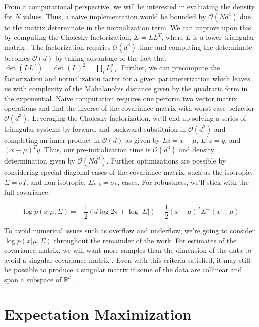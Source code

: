 \documentclass{article}
\newcommand{\boundedBy}[1]{\mathcal{O} \left ( #1 \right )}
\begin{document}
From a computational perspective, we will be interested in evaluating the density for $N$ values. Thus, a naive implementation would be bounded by $\boundedBy{N d^4}$ due to the matrix determinate in the normalization term. We can improve upon this by computing the Cholesky factorization, $\Sigma = L L^T$, where $L$ is a lower triangular matrix \cite[157-158]{kincaid2002}. The factorization requries $\boundedBy{d^3}$ time and computing the determinate becomes $\boundedBy{d}$ by taking advantage of the fact that $\det\left(L L^T\right) = \det(L)^2 = \prod_i L_{i,i}^2$. Further, we can precompute the factorization and normalization factor for a given parameterization which leaves us with complexity of the Mahalanobis distance given by the quadratic form in the exponential. Naive computation requires one perform two vector matrix operations and find the inverse of the covariance matrix with worst case behavior $\boundedBy{d^3}$. Leveraging the Cholesky factorization, we'll end up solving a series of triangular systems by forward and backward substituion in $\boundedBy{d^2}$ and completing an inner product in $\boundedBy{d}$ as given by $L z = x - \mu$, $L^T z = y$, and $(x-\mu)^T y$. Thus, our pre-initialization time is $\boundedBy{d^3}$ and density determination given by $\boundedBy{N d^2}$. Further optimizations are possible by considering special diagonal cases of the covariance matrix, such as the isotropic, $\Sigma = \sigma I$, and non-isotropic, $\Sigma_{k,k} = \sigma_k$, cases. For robustness, we'll stick with the full covariance.

\begin{equation}
	\log p( x \lvert \mu, \Sigma ) = - \frac{1}{2} \left( d \log 2\pi + \log \lvert \Sigma \rvert \right ) - \frac{1}{2} (x - \mu)^{T} \Sigma^{-} (x - \mu)
\end{equation}

To avoid numerical issues such as overflow and underflow, we're going to consider $\log p(x \lvert \mu, \Sigma)$ throughout the remainder of the work. For estimates of the covariance matrix, we will want more samples than the dimension of the data to avoid a singular covariance matrix \cite{fan2016overview}. Even with this criteria satisfied, it may still be possible to produce a singular matrix if some of the data are collinear and span a subspace of $\mathbb{R}^d$.

\section{Expectation Maximization}
\end{document}
